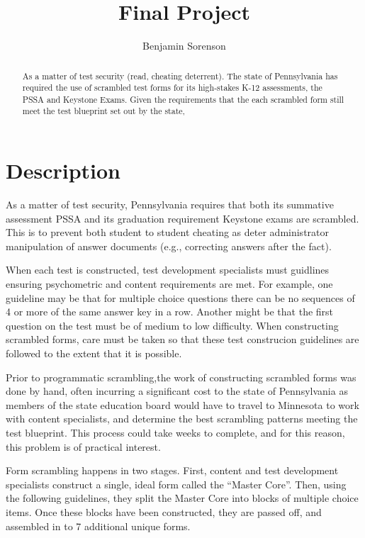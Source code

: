 \documentclass[11pt]{article}
\begin{document}
\author{Benjamin Sorenson} \title{Final Project}
\maketitle

\begin{abstract}
  As a matter of test security (read, cheating deterrent). The state
  of Pennsylvania has required the use of scrambled test forms for its
  high-stakes K-12 assessments, the PSSA and Keystone Exams. Given the
  requirements that the each scrambled form still meet the test
  blueprint set out by the state,
\end{abstract}
\section{Description}
\par
As a matter of test security, Pennsylvania requires that both its
summative assessment PSSA and its graduation requirement Keystone
exams are scrambled. This is to prevent both student to student
cheating as deter administrator manipulation of answer documents
(e.g., correcting answers after the fact).
\par
When each test is constructed, test development specialists must
guidlines ensuring psychometric and content requirements are met. For
example, one guideline may be that for multiple choice questions there
can be no sequences of 4 or more of the same answer key in a row.
Another might be that the first question on the test must be of medium
to low difficulty.  When constructing scrambled forms, care must be
taken so that these test construcion guidelines are followed to the
extent that it is possible.
\par
Prior to programmatic scrambling,the work of constructing scrambled
forms was done by hand, often incurring a significant cost to the
state of Pennsylvania as members of the state education board would
have to travel to Minnesota to work with content specialists, and
determine the best scrambling patterns meeting the test
blueprint. This process could take weeks to complete, and for this
reason, this problem is of practical interest.
\par
Form scrambling happens in two stages.  First, content and test
development specialists construct a single, ideal form called the
``Master Core''.  Then, using the following guidelines, they split the
Master Core into blocks of multiple choice items. Once these blocks
have been constructed, they are passed off, and assembled in to 7
additional unique forms.
\end{document}

